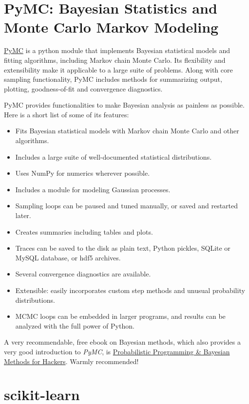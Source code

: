 \section{PyMC: Bayesian Statistics and Monte Carlo Markov Modeling}

\href{http://pymc-devs.github.io/pymc/}{PyMC} is a python module that implements Bayesian statistical models and fitting algorithms, including Markov chain Monte Carlo. Its flexibility and extensibility make it applicable to a large suite of problems. Along with core sampling functionality, PyMC includes methods for summarizing output, plotting, goodness-of-fit and convergence diagnostics.

PyMC provides functionalities to make Bayesian analysis as painless as possible. Here is a short list of some of its features:

\begin{itemize}
    \item Fits Bayesian statistical models with Markov chain Monte Carlo and other algorithms.
    \item Includes a large suite of well-documented statistical distributions.
    \item Uses NumPy for numerics wherever possible.
    \item Includes a module for modeling Gaussian processes.
    \item Sampling loops can be paused and tuned manually, or saved and restarted later.
    \item Creates summaries including tables and plots.
    \item Traces can be saved to the disk as plain text, Python pickles, SQLite or MySQL database, or hdf5 archives.
    \item Several convergence diagnostics are available.
    \item Extensible: easily incorporates custom step methods and unusual probability distributions.
    \item MCMC loops can be embedded in larger programs, and results can be analyzed with the full power of Python.
\end{itemize}

A very recommendable, free ebook on Bayesian methods, which also provides a very good introduction to \emph{PyMC}, is \href{http://camdavidsonpilon.github.io/Probabilistic-Programming-and-Bayesian-Methods-for-Hackers/}{
Probabilistic Programming \& Bayesian Methods for Hackers}. Warmly recommended!

\section{scikit-learn}

